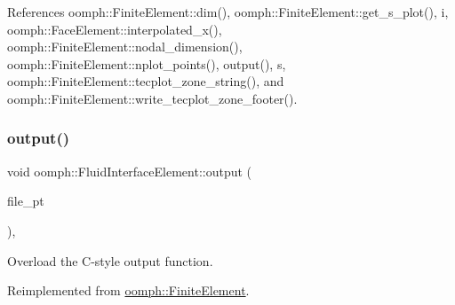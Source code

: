 References oomph\+::\+Finite\+Element\+::dim(), oomph\+::\+Finite\+Element\+::get\+\_\+s\+\_\+plot(), i, oomph\+::\+Face\+Element\+::interpolated\+\_\+x(), oomph\+::\+Finite\+Element\+::nodal\+\_\+dimension(), oomph\+::\+Finite\+Element\+::nplot\+\_\+points(), output(), s, oomph\+::\+Finite\+Element\+::tecplot\+\_\+zone\+\_\+string(), and oomph\+::\+Finite\+Element\+::write\+\_\+tecplot\+\_\+zone\+\_\+footer().

\mbox{\label{classoomph_1_1FluidInterfaceElement_ad39bb9862c7f76e07d5ac006a1209cf9}} 
\subsubsection{\texorpdfstring{output()}{output()}\hspace{0.1cm}{\footnotesize\ttfamily [3/4]}}
{\footnotesize\ttfamily void oomph\+::\+Fluid\+Interface\+Element\+::output (\begin{DoxyParamCaption}\item[{F\+I\+LE $\ast$}]{file\+\_\+pt }\end{DoxyParamCaption})\hspace{0.3cm}{\ttfamily [inline]}, {\ttfamily [virtual]}}



Overload the C-\/style output function. 



Reimplemented from \hyperlink{classoomph_1_1FiniteElement_a72cddd09f8ddbee1a20a1ff404c6943e}{oomph\+::\+Finite\+Element}.



